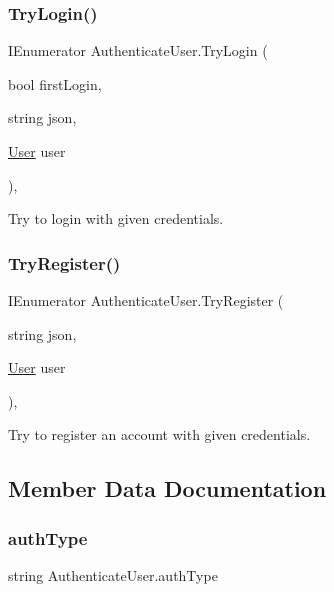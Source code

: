 \subsubsection{\texorpdfstring{TryLogin()}{TryLogin()}}
{\footnotesize\ttfamily I\+Enumerator Authenticate\+User.\+Try\+Login (\begin{DoxyParamCaption}\item[{bool}]{first\+Login,  }\item[{string}]{json,  }\item[{\mbox{\hyperlink{class_user}{User}}}]{user }\end{DoxyParamCaption})\hspace{0.3cm}{\ttfamily [inline]}, {\ttfamily [private]}}



Try to login with given credentials. 

\mbox{\label{class_authenticate_user_a1243f9482a71212db33a555534a1bc97}} 
\subsubsection{\texorpdfstring{TryRegister()}{TryRegister()}}
{\footnotesize\ttfamily I\+Enumerator Authenticate\+User.\+Try\+Register (\begin{DoxyParamCaption}\item[{string}]{json,  }\item[{\mbox{\hyperlink{class_user}{User}}}]{user }\end{DoxyParamCaption})\hspace{0.3cm}{\ttfamily [inline]}, {\ttfamily [private]}}



Try to register an account with given credentials. 



\subsection{Member Data Documentation}
\mbox{\label{class_authenticate_user_a299b64de03d6461c988a78593365624b}} 
\subsubsection{\texorpdfstring{authType}{authType}}
{\footnotesize\ttfamily string Authenticate\+User.\+auth\+Type}


